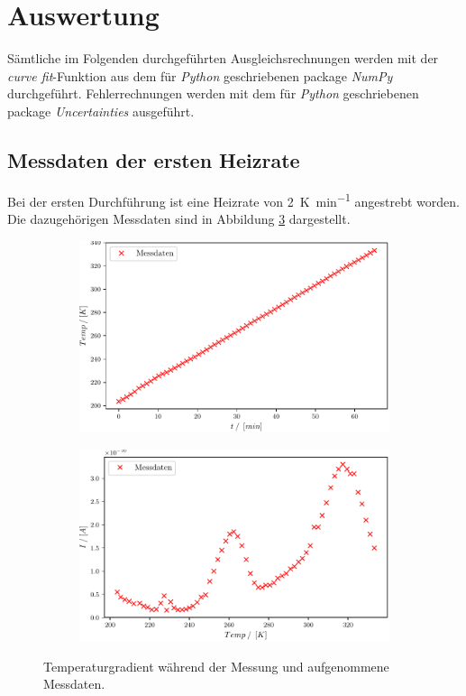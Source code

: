 \section{Auswertung}
\label{sec:Auswertung}
Sämtliche im Folgenden durchgeführten Ausgleichsrechnungen werden mit der \emph{curve fit}-Funktion aus dem für \emph{Python} geschriebenen package \emph{NumPy}\cite{scipy} durchgeführt. Fehlerrechnungen werden mit dem für \emph{Python} geschriebenen package \emph{Uncertainties}\cite{uncertainties} ausgeführt.

\subsection{Messdaten der ersten Heizrate}
\label{sec:hohe_heizrate}
Bei der ersten Durchführung ist eine Heizrate von \SI{2}{\kelvin\per\minute} angestrebt worden. Die dazugehörigen Messdaten sind in Abbildung \ref{fig:Auswertung_1_2} dargestellt.


\begin{figure}[H]
\centering
\begin{subfigure}{.5\textwidth}
	\centering
	\includegraphics[width=1\textwidth]{build/1_Temp_Time.pdf}
	\caption{}
	\label{fig:Auswertung_1}
\end{subfigure}%
\begin{subfigure}{.5\textwidth}
	\centering
	\includegraphics[width=1\textwidth]{build/1_Temp_current.pdf}
	\caption{}
	\label{fig:Auswertung_2}
\end{subfigure}
\caption{Temperaturgradient während der Messung und aufgenommene Messdaten.}
\label{fig:Auswertung_1_2}
\end{figure}

